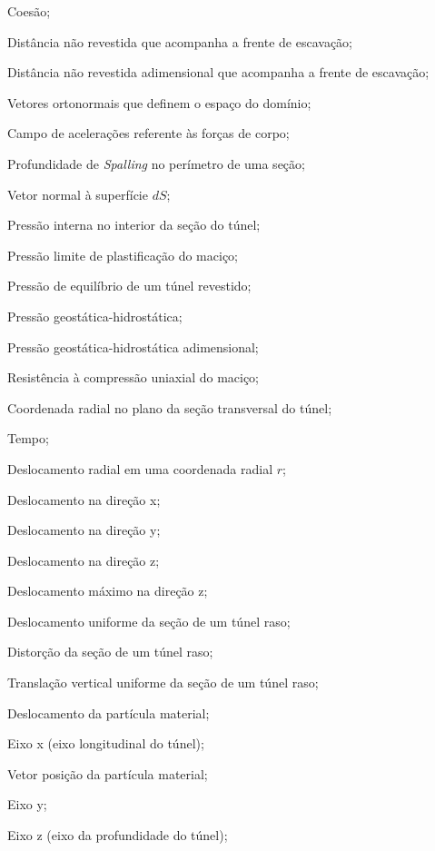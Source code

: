 
\item[$c$]				Coesão;
\item[$d_0$]			Distância não revestida que acompanha a frente de escavação;
\item[$d_0^*$]			Distância não revestida adimensional que acompanha a frente de escavação;
\item[$\euml, \edoisl, \etresl$] Vetores ortonormais que definem o espaço do domínio;
\item[$\fl$]			Campo de acelerações referente às forças de corpo;
\item[$h_s$]			Profundidade de \textit{Spalling} no perímetro de uma seção;
\item[$\nl$]			Vetor normal à superfície $dS$;
\item[$ p_i $]			Pressão interna no interior da seção do túnel;
\item[$ p_{lim} $] 		Pressão limite de plastificação do maciço;
\item[$ p_{eq} $] 		Pressão de equilíbrio de um túnel revestido;
\item[$ p_\infty $]		Pressão geostática-hidrostática;
\item[$ p_\infty^* $]	Pressão geostática-hidrostática adimensional;
\item[$ q_0 $] 			Resistência à compressão uniaxial do maciço;
\item[$ r $]			Coordenada radial no plano da seção transversal do túnel;
\item[$ t $] 			Tempo;
\item[$ u(r) $] 		Deslocamento radial em uma coordenada radial $r$;
\item[$ u_x $] 			Deslocamento na direção x;
\item[$ u_y $] 			Deslocamento na direção y;
\item[$ u_z $] 			Deslocamento na direção z;
\item[$ u_{z_{max}} $] 	Deslocamento máximo na direção z;
\item[$ u_\varepsilon $] Deslocamento uniforme da seção de um túnel raso;
\item[$ u_\delta $] 	 Distorção da seção de um túnel raso;
\item[$ \Delta u_y $] 	 Translação vertical uniforme da seção de um túnel raso;
\item[$ \ul $] 		    Deslocamento da partícula material;
\item[$x$]				Eixo x (eixo longitudinal do túnel);
\item[$\xl$]			Vetor posição da partícula material;
\item[$y$]				Eixo y;
\item[$z$]				Eixo z (eixo da profundidade do túnel);

